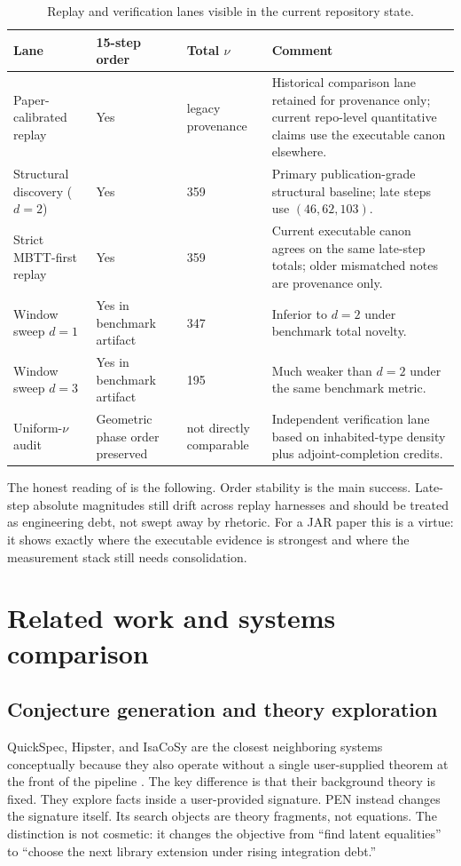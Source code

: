 \documentclass[pdflatex,sn-mathphys,Numbered]{sn-jnl}
\theoremstyle{thmstyleone}
\theoremstyle{thmstylethree}
\theoremstyle{thmstyletwo}
\begin{document}
\begin{table}[t]
\centering
\caption{Replay and verification lanes visible in the current repository state.}
\label{tab:lanes}
\footnotesize
\begin{tabular}{@{}p{3.35cm}p{1.4cm}p{1.45cm}p{5.0cm}@{}}
\toprule
Lane & 15-step order & Total $\nu$ & Comment \\
\midrule
Paper-calibrated replay & Yes & legacy provenance & Historical comparison lane retained for provenance only; current repo-level quantitative claims use the executable canon elsewhere. \\
Structural discovery ($d=2$) & Yes & 359 & Primary publication-grade structural baseline; late steps use $(46,62,103)$. \\
Strict MBTT-first replay & Yes & 359 & Current executable canon agrees on the same late-step totals; older mismatched notes are provenance only. \\
Window sweep $d=1$ & Yes in benchmark artifact & 347 & Inferior to $d=2$ under benchmark total novelty. \\
Window sweep $d=3$ & Yes in benchmark artifact & 195 & Much weaker than $d=2$ under the same benchmark metric. \\
Uniform-$\nu$ audit & Geometric phase order preserved & not directly comparable & Independent verification lane based on inhabited-type density plus adjoint-completion credits. \\
\bottomrule
\end{tabular}
\end{table}

The honest reading of  is the following. Order stability is the main success. Late-step absolute magnitudes still drift across replay harnesses and should be treated as engineering debt, not swept away by rhetoric. For a JAR paper this is a virtue: it shows exactly where the executable evidence is strongest and where the measurement stack still needs consolidation.

\section{Related work and systems comparison}\label{sec:related}

\subsection{Conjecture generation and theory exploration}

QuickSpec, Hipster, and IsaCoSy are the closest neighboring systems conceptually because they also operate without a single user-supplied theorem at the front of the pipeline \cite{quickspec,isacosy,hipster}. The key difference is that their background theory is fixed. They explore facts inside a user-provided signature. PEN instead changes the signature itself. Its search objects are theory fragments, not equations. The distinction is not cosmetic: it changes the objective from ``find latent equalities'' to ``choose the next library extension under rising integration debt.''
\end{document}
